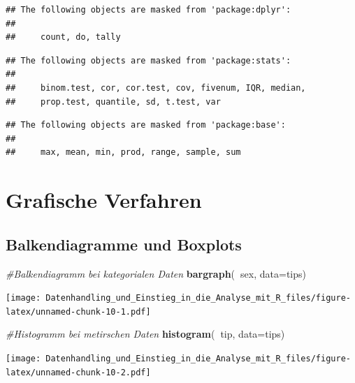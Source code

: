 \documentclass[10pt,ngerman,onside]{article}
\newenvironment{Shaded}{\begin{snugshade}}{\end{snugshade}}
\newcommand{\KeywordTok}[1]{\textcolor[rgb]{0.13,0.29,0.53}{\textbf{#1}}}
\newcommand{\DataTypeTok}[1]{\textcolor[rgb]{0.13,0.29,0.53}{#1}}
\newcommand{\CommentTok}[1]{\textcolor[rgb]{0.56,0.35,0.01}{\textit{#1}}}
\newcommand{\OperatorTok}[1]{\textcolor[rgb]{0.81,0.36,0.00}{\textbf{#1}}}
\newcommand{\NormalTok}[1]{#1}
\begin{document}
\begin{verbatim}
## The following objects are masked from 'package:dplyr':
## 
##     count, do, tally
\end{verbatim}

\begin{verbatim}
## The following objects are masked from 'package:stats':
## 
##     binom.test, cor, cor.test, cov, fivenum, IQR, median,
##     prop.test, quantile, sd, t.test, var
\end{verbatim}

\begin{verbatim}
## The following objects are masked from 'package:base':
## 
##     max, mean, min, prod, range, sample, sum
\end{verbatim}

\hypertarget{grafische-verfahren}{%
\section{Grafische Verfahren}\label{grafische-verfahren}}

\hypertarget{balkendiagramme-und-boxplots}{%
\subsection{Balkendiagramme und
Boxplots}\label{balkendiagramme-und-boxplots}}

\begin{Shaded}
\begin{Highlighting}[]
\CommentTok{#Balkendiagramm bei kategorialen Daten}
\KeywordTok{bargraph}\NormalTok{(}\OperatorTok{~}\NormalTok{sex, }\DataTypeTok{data=}\NormalTok{tips)}
\end{Highlighting}
\end{Shaded}

\texttt{[image: Datenhandling\_und\_Einstieg\_in\_die\_Analyse\_mit\_R\_files/figure-latex/unnamed-chunk-10-1.pdf]}

\begin{Shaded}
\begin{Highlighting}[]
\CommentTok{#Histogramm bei metirschen Daten}
\KeywordTok{histogram}\NormalTok{(}\OperatorTok{~}\NormalTok{tip, }\DataTypeTok{data=}\NormalTok{tips)}
\end{Highlighting}
\end{Shaded}

\texttt{[image: Datenhandling\_und\_Einstieg\_in\_die\_Analyse\_mit\_R\_files/figure-latex/unnamed-chunk-10-2.pdf]}
\end{document}
